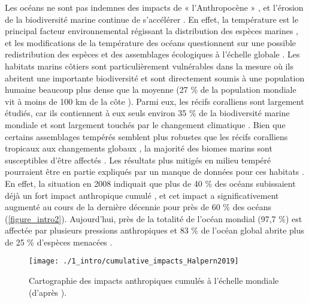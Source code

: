 Les océans ne sont pas indemnes des impacts de « l’Anthropocène » \citep{mcgill_fifteen_2015}, et l’érosion de la biodiversité marine continue de s’accélérer \citep{mccauley_marine_2015, bindoff_changing_2019, ohara_mapping_2019}. En effet, la température est le principal facteur environnemental régissant la distribution des espèces marines \citep{tittensor_global_2010}, et les modifications de la température des océans questionnent sur une possible redistribution des espèces et des assemblages écologiques à l’échelle globale \citep{pereira_scenarios_2010, tittensor_global_2010, poloczanska_responses_2016}. Les habitats marins côtiers sont particulièrement vulnérables dans la mesure où ils abritent une importante biodiversité \citep{halpern_global_2008} et sont directement soumis à une population humaine beaucoup plus dense que la moyenne (27 \% de la population mondiale vit à moins de 100 km de la côte \citep{kummu_over_2016}). Parmi eux, les récifs coralliens sont largement étudiés, car ils contiennent à eux seuls environ 35 \% de la biodiversité marine mondiale \citep{reaka-kudla_biodiversity_2005} et sont largement touchés par le changement climatique \citep{hoegh-guldberg_coral_2007, death_27-year_2012, graham_predicting_2015, hughes_coral_2017}. Bien que certains assemblages tempérés semblent plus robustes que les récifs coralliens tropicaux aux changements globaux \citep{stuart-smith_stability_2010}, la majorité des biomes marins sont susceptibles d’être affectés \citep{waycott_accelerating_2009, marba_mediterranean_2014, telesca_seagrass_2015, wernberg_climate-driven_2016, halpern_recent_2019, ohara_mapping_2019}. Les résultats plus mitigés en milieu tempéré pourraient être en partie expliqués par un manque de données pour ces habitats \citep{wernberg_impacts_2011}. En effet, la situation en 2008 indiquait que plus de 40 \% des océans subissaient déjà un fort impact anthropique cumulé \citep{halpern_global_2008}, et cet impact a significativement augmenté au cours de la dernière décennie pour près de 60 \% des océans \citep{halpern_recent_2019} (\autoref{figure_intro2}). Aujourd’hui, près de la totalité de l’océan mondial (97,7 \%) est affectée par plusieurs pressions anthropiques \citep{halpern_spatial_2015} et 83 \% de l’océan global abrite plus de 25 \% d’espèces menacées \citep{ohara_mapping_2019}.

\begin{figure}[H]
	\begin{center}
	\texttt{[image: ./1\_intro/cumulative\_impacts\_Halpern2019]}
		\caption[Cartographie des impacts anthropiques cumulés à l’échelle mondiale]{Cartographie des impacts anthropiques cumulés à l’échelle mondiale (d'après \citet{halpern_recent_2019}).}
	\label{figure_intro2}
\end{center}
\end{figure}

